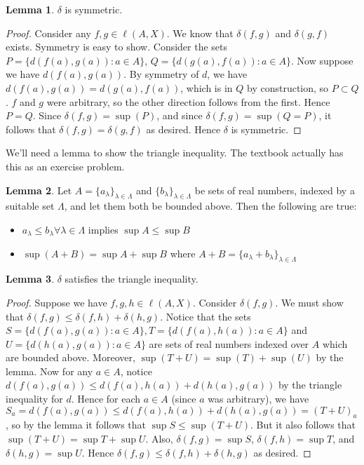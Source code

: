 \documentclass[11pt]{article}
\theoremstyle{definition}
\newtheorem{lemma}{Lemma}
\begin{document}
\begin{lemma}
$\delta$ is symmetric.
\end{lemma}
\begin{proof}
Consider any $f,g\in \ell(A,X)$. We know that $\delta(f,g)$ and $\delta(g,f)$ exists. Symmetry is easy to show. Consider the sets $P = \{d(f(a),g(a) ):a\in A\}$, $Q = \{d(g(a), f(a)): a\in A\}$. Now suppose we have $d(f(a), g(a))$. By symmetry of $d$, we have $d(f(a), g(a) ) = d(g(a), f(a))$, which is in $Q$ by construction, so $P\subset Q$. $f$ and $g$ were arbitrary, so the other direction follows from the first. Hence $P = Q$. Since $\delta(f,g) = \sup(P)$, and since $\delta(f,g) = \sup(Q = P)$, it follows that $\delta(f,g) = \delta(g,f)$ as desired. Hence $\delta$ is symmetric.
\end{proof}

We'll need a lemma to show the triangle inequality. The textbook actually has this as an exercise problem. 
\begin{lemma}
Let $A = \{a_\lambda\}_{\lambda \in\Lambda}$ and $\{b_\lambda\}_{\lambda\in \Lambda}$ be sets of real numbers, indexed by a suitable set $\Lambda$, and let them both be bounded above. Then the following are true: 

\begin{itemize}
\item $a_\lambda\le b_\lambda \forall \lambda\in \Lambda$ implies $\sup A \le \sup B$
\item $ \sup(A+ B) = \sup A + \sup B $ where $A + B = \{a_\lambda + b_\lambda\}_{\lambda\in \Lambda}$
\end{itemize}

\end{lemma}
\begin{lemma}
$\delta$ satisfies the triangle inequality.
\end{lemma}

\begin{proof}
Suppose we have $f,g,h\in \ell(A,X)$. Consider $\delta(f,g)$. We must show that $\delta(f,g) \le \delta(f,h) + \delta(h,g)$. Notice that the sets $S = \{d(f(a), g(a)) : a\in A\},  T = \{d(f(a), h(a)) : a\in A\}$ and $U = \{d(h(a), g(a)) : a\in A\}$ are sets of real numbers indexed over $A$ which are bounded above. Moreover, $\sup (T + U) = \sup (T) + \sup (U)$ by the lemma. Now for any $a\in A$, notice $d(f(a), g(a)) \le d(f(a), h(a)) + d(h(a), g(a))$ by the triangle inequality for $d$. Hence for each $a\in A$ (since $a$ was arbitrary), we have $S_a = d(f(a), g(a)) \le d(f(a), h(a)) + d(h(a), g(a)) = (T + U)_a$, so by the lemma it follows that $\sup S \le \sup (T+U)$. But it also follows that $\sup(T + U) = \sup T + \sup U $. Also, $\delta(f,g) = \sup S$, $\delta(f,h) = \sup T$, and $\delta(h,g) = \sup U$. Hence $\delta (f,g) \le \delta(f,h) + \delta(h,g)$ as desired. 
\end{proof}
\end{document}
